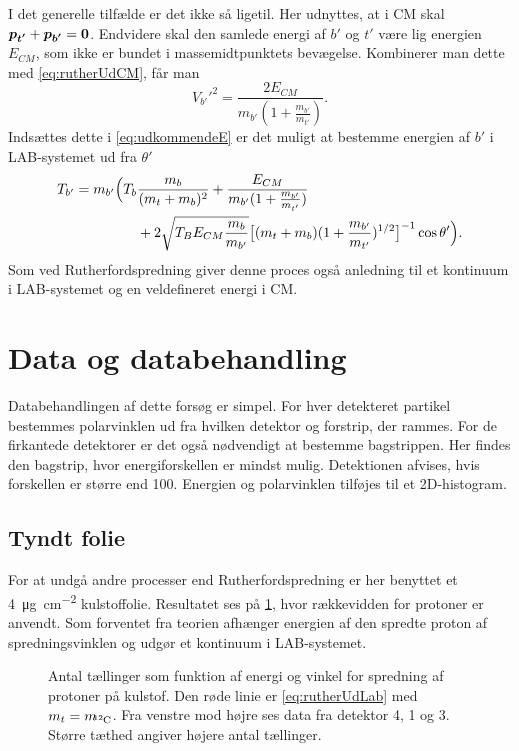 I det generelle tilfælde er det ikke så ligetil. Her udnyttes, at i CM skal
$\bm{p_{t'}} + \bm{p_{b'}} = \bm{0}$. Endvidere skal den samlede energi af $b'$ og $t'$ være
lig energien $E_{CM}$, som ikke er bundet i massemidtpunktets bevægelse. Kombinerer man dette med
\cref{eq:rutherUdCM}, får man
\begin{equation}
  V_{b'}'^{2} = \frac{2E_{CM}}{m_{b'}(1+\frac{m_{b'}}{m_{t'}})}.
\end{equation}
Indsættes dette i \cref{eq:udkommendeE} er det muligt at bestemme energien af $b'$ i LAB-systemet ud
fra $\theta'$
\begin{align}
  T_{b'} = m_{b'} \Bigl(T_{b}&\frac{m_{b}}{(m_{t} + m_{b})^{2}} + \frac{E_{CM}}{m_{b'}(1+\frac{m_{b'}}{m_{t'}})} \notag\\
  &+ 2 \sqrt{T_{B}E_{CM} \frac{m_{b}}{m_{b'}}}\bigl[(m_{t} + m_{b})(1 + \frac{m_{b'}}{m_{t'}})^{1/2}\bigr]^{-1} \cos \theta'\Bigr).
  \label{eq:alphaUdLab}
\end{align}
Som ved Rutherfordspredning giver denne proces også anledning til et kontinuum i LAB-systemet og
en veldefineret energi i CM. 


\section{Data og databehandling}
\label{sec:ruther-data}

Databehandlingen af dette forsøg er simpel. For hver detekteret partikel bestemmes polarvinklen ud
fra hvilken detektor og forstrip, der rammes. For de firkantede detektorer er det også nødvendigt at
bestemme bagstrippen. Her findes den bagstrip, hvor energiforskellen er mindst mulig. Detektionen
afvises, hvis forskellen er større end 100\keV. Energien og polarvinklen tilføjes til et
2D-histogram.

\subsection{Tyndt folie}
\label{sec:tyndtfolie}

For at undgå andre processer end Rutherfordspredning er her benyttet et \SI[per-mode =
symbol]{4}{\micro\gram\per\cm\squared} kulstoffolie. Resultatet ses på \cref{fig:1072}, hvor
rækkevidden for protoner er anvendt. Som forventet fra teorien afhænger energien af den spredte
proton af spredningsvinklen og udgør et kontinuum i LAB-systemet.
\begin{figure}[htb]
  \centering
  \hfill
  \caption{Antal tællinger som funktion af energi og vinkel for spredning af protoner på
    kulstof. Den røde linie er \cref{eq:rutherUdLab} med $m_{t} = m_{\!\!\Carb}$. Fra venstre mod
    højre ses data fra detektor 4, 1 og 3. Større tæthed angiver højere antal tællinger.}
  \label{fig:1072}
\end{figure}

